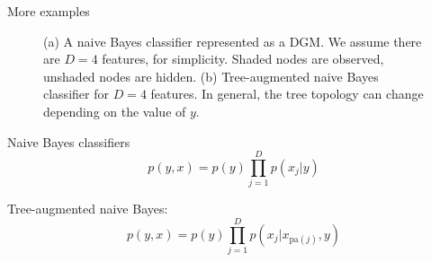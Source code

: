 \documentclass[10pt,mathserif]{beamer}
\begin{document}
\begin{frame}{More examples}
\begin{figure}[h]
\centering     %
{}
\caption{(a) A naive Bayes classifier represented as a DGM. We assume there are $D = 4$ features, for simplicity. Shaded nodes are observed, unshaded nodes are hidden. (b) Tree-augmented naive Bayes classifier for $D = 4$ features. In general, the tree topology can change depending on the value of $y$.}
\end{figure}        

Naive Bayes classifiers
\begin{equation}
    p(y,x) = p(y) \prod_{j=1}^D p(x_j|y)
\end{equation}

Tree-augmented naive Bayes:
\begin{equation}
    p(y,x) = p(y) \prod_{j=1}^D p(x_j|x_{\text{pa}(j)},y)
\end{equation} 
\end{frame}
\end{document}
